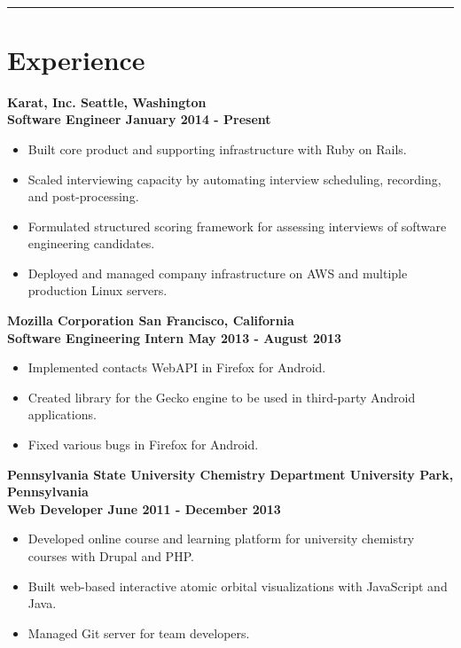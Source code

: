 \documentclass[letterpaper]{article}
\newcommand{\setfontsize}{\fontsize{11.5}{16}\selectfont}
\newcommand{\sectionrule}[1] {
  \noindent\rule{\textwidth}{.1mm}
  \vspace{-11mm}
  \section{#1}
}
\newenvironment{indentsection}
  {\begin{adjustwidth}{10mm}{0pt}}
  {\end{adjustwidth}}
\newcommand{\job}[5] {
  \noindent\textbf{#1 \hfill #2}\\
  \textbf{#3 \hfill #4 - #5}

  \vspace{1mm}
}
\begin{document}
  \setfontsize

  \vspace{2mm}\\

  \sectionrule{Experience}

  \begin{indentsection}
    \job{Karat, Inc.}{Seattle, Washington}{Software Engineer}{January 2014}{Present}
    \begin{itemize}
      \item Built core product and supporting infrastructure with Ruby on Rails.
      \item Scaled interviewing capacity by automating interview scheduling, recording, and post-processing.
      \item Formulated structured scoring framework for assessing interviews of software engineering candidates.
      \item Deployed and managed company infrastructure on AWS and multiple production Linux servers.
    \end{itemize}

    \vspace{3mm}

    \job{Mozilla Corporation}{San Francisco, California}{Software Engineering Intern}{May 2013}{August 2013}
    \begin{itemize}
      \item Implemented contacts WebAPI in Firefox for Android.
      \item Created library for the Gecko engine to be used in third-party Android applications.
      \item Fixed various bugs in Firefox for Android.
    \end{itemize}

    \vspace{3mm}

    \job{Pennsylvania State University Chemistry Department}{University Park, Pennsylvania}{Web Developer}{June 2011}{December 2013}
    \begin{itemize}
      \item Developed online course and learning platform for university chemistry courses with Drupal and PHP.
      \item Built web-based interactive atomic orbital visualizations with JavaScript and Java.
      \item Managed Git server for team developers.
    \end{itemize}
  \end{indentsection}
\end{document}
